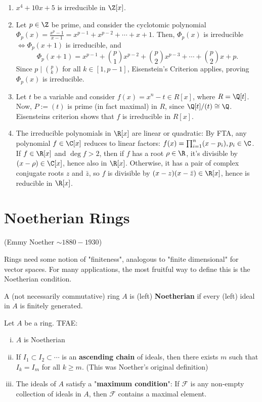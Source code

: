 \begin{ex}
    \begin{enumerate}
        \item $x^4+10x+5$ is irreducible in $\Z[x]$.
        \item Let $p \in \Z$ be prime, and consider the cyclotomic polynomial $\Phi_p(x) = \frac{x^p-1}{x-1}=x^{p-1}+x^{p-2}+\cdots +x+1$. Then, $\Phi_p(x)$ is irreducible $\iff \Phi _p(x+1)$ is irreducible, and
        $$\Phi_p(x+1)=x^{p-1}+\binom{p}{1}x^{p-2}+\binom{p}{2}x^{p-3}+\cdots +\binom{p}{2}x + p.$$
        Since $p \mid \binom{p}{k}$ for all $k \in [1,p-1]$, Eisenstein's Criterion applies, proving $\Phi_p(x)$ is irreducible.
        \item Let $t$ be a variable and consider $f(x) =x^n-t \in R[x]$, where $R = \Q[t]$. Now, $P:= (t)$ is prime (in fact maximal) in $R$, since $\Q[t] / (t) \cong \Q$. Eisensteins criterion shows that $f$ is irreducible in $R[x]$.
        \item The irreducible polynomials in $\R[x]$ are linear or quadratic: By FTA, any polynomial $f \in \C[x]$ reduces to linear factors: $f(x) = \prod _{i=1}^n(x-p_i),p_i\in \C$. If $f \in \R[x]$ and $\deg f >2$, then if $f$ has a root $\rho \in \R$, it's divisible by $(x-\rho ) \in \C[x]$, hence also in $\R[x]$. Otherwise, it has a pair of complex conjugate roots $z$ and $\bar z$, so $f$ is divisible by $(x-z)(x-\bar z) \in \R[x]$, hence is reducible in $\R[x]$.
    \end{enumerate}
\end{ex}

\section{Noetherian Rings}
(Emmy Noether $\sim 1880-1930$)

Rings need some notion of "finiteness", analogous to "finite dimensional" for vector spaces. For many applications, the most fruitful way to define this is the Noetherian condition.

\begin{defn}
    A (not necessarily commutative) ring $A$ is (left) \textbf{Noetherian} if every (left) ideal in $A$ is finitely generated.
\end{defn}

\begin{prop}
    Let $A$ be a ring. TFAE:
    \begin{enumerate}[(i)]
        \item $A$ is Noetherian
        \item If $I_1\subset I_2 \subset \cdots$ is an \textbf{ascending chain} of ideals, then there exists $m$ such that $I_k = I_m$ for all $k \geq m$. (This was Noether's original definition)
        \item The ideals of $A$ satisfy a "\textbf{maximum condition}": If $\mathcal F$ is any non-empty collection of ideals in $A$, then $\mathcal F$ contains a maximal element.
    \end{enumerate}
\end{prop}


